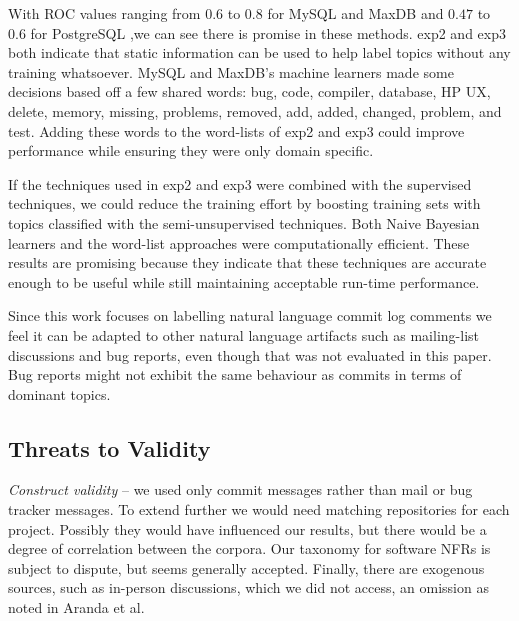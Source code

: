 \documentclass[smallextended]{svjour3}       %
\begin{document}

With ROC values ranging from $0.6$ to $0.8$ for MySQL and MaxDB and
$0.47$ to $0.6$ for PostgreSQL ,we can see there is promise in these methods.
\textsf{exp2} and \textsf{exp3} both indicate that static information can be used to help label topics without any training whatsoever. 
MySQL and MaxDB's machine learners made some decisions based off a few shared words: \textsf{bug, code, compiler, database, HP UX, delete, memory,
missing, problems, removed, add, added, changed, problem, and test}. 
Adding these words to the word-lists of \textsf{exp2} and \textsf{exp3} could improve performance while ensuring they were only domain specific.

If the techniques used in \textsf{exp2} and \textsf{exp3} were combined with the supervised techniques, we could reduce the training effort by boosting
training sets with topics classified with the semi-unsupervised techniques.
Both Naive Bayesian learners and the word-list approaches were computationally efficient.  
These results are promising because they indicate that these
techniques are accurate enough to be useful while still maintaining
acceptable run-time performance.

Since this work focuses on labelling natural language commit log
comments we feel it can be adapted to other natural language artifacts
such as mailing-list discussions and bug reports, even though that was
not evaluated in this paper. Bug reports might not exhibit the same
behaviour as commits in terms of dominant topics.

\subsection{Threats to Validity}
\emph{Construct validity} -- we used only commit messages rather than
mail or bug tracker messages. 
To extend further we would need matching repositories for each project.
Possibly they would have influenced our results, but there would be a degree of correlation between the corpora.
Our taxonomy for software NFRs is subject to dispute, but seems
generally accepted. Finally, there are exogenous sources, such as
in-person discussions, which we did not access, an omission as noted
in Aranda et al.~\cite{aranda09icse} %
\end{document}
